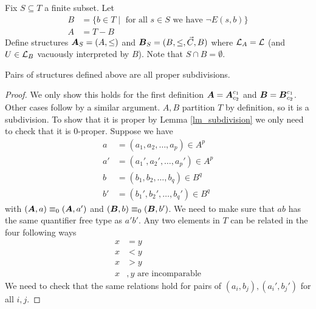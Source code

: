\documentclass{amsart}
\DeclareMathOperator{\A}{\boldface A}
\DeclareMathOperator{\B}{\boldface B}
\begin{document}
\begin{Definition}
	Fix $S \subseteq T$ a finite subset. Let
	\begin{align*}
		B &= \{b \in T \mid \text{ for all $s \in S$ we have } \neg E(s, b)\} \\
		A &= T - B
	\end{align*}
	Define structures $\A_{S} = (A, \leq)$ and $\B_{S} = (B, \leq, \vec C, B)$ where $\mathcal L_A = \mathcal L$ (and $U \in \mathcal L_B$ vacuously interpreted by $B$). Note that $S \cap B = \emptyset$.
\end{Definition}

\begin{Lemma}
	Pairs of structures defined above are all proper subdivisions.
\end{Lemma}

\begin{proof}
	We only show this holds for the first definition $\A = \A^{c_1}_{c_2}$ and $\B = \B^{c_1}_{c_2}$. Other cases follow by a similar argument. $A,B$ partition $T$ by definition, so it is a subdivision. To show that it is proper by Lemma \ref{lm_subdivision} we only need to check that it is $0$-proper. Suppose we have 
	\begin{align*}
		a &= (a_1, a_2, \ldots, a_p) \in A^p \\
		a' &= (a_1', a_2', \ldots, a_p') \in A^p  \\
		b &= (b_1, b_2, \ldots, b_q) \in B^q  \\
		b' &= (b_1', b_2', \ldots, b_q') \in B^q 
	\end{align*}
	with $(\A, a) \equiv_0 (\A, a')$ and $(\B, b) \equiv_0 (\B, b')$. We need to make sure that $ab$ has the same quantifier free type as $a'b'$. Any two elements in $T$ can be related in the four following ways
	\begin{align*}
		x &= y \\
		x &< y \\
		x &> y \\
		x&,y \text{ are incomparable}
	\end{align*}
	We need to check that the same relations hold for pairs of $(a_i, b_j), (a_i', b_j')$ for all $i,j$.
	

\end{proof}
\end{document}
